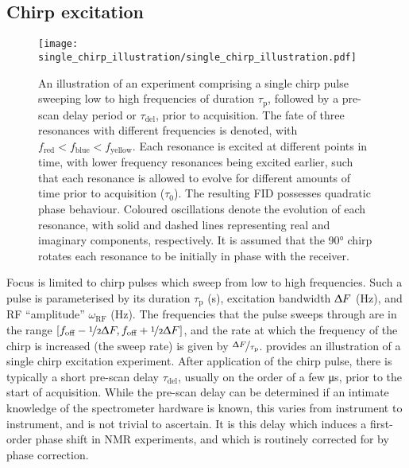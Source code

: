 \subsection{Chirp excitation}
\begin{figure}
    \centering
    \texttt{[image: single\_chirp\_illustration/single\_chirp\_illustration.pdf]}
    \caption[
        An illustration of an experiment comprising a single chirp pulse.
    ]
    {
        An illustration of an experiment comprising a single chirp pulse sweeping
        low to high frequencies of duration $\tau_{\text{p}}$, followed by
        a pre-scan delay period or $\tau_{\text{del}}$, prior to
        acquisition. The fate of three resonances with different frequencies is
        denoted, with $f_{\text{red}} < f_{\text{blue}} <
        f_{\text{yellow}}$. Each resonance is excited at different points
        in time, with lower frequency resonances being excited earlier, such that
        each resonance is allowed to evolve for different amounts of time prior
        to acquisition ($\tau_0$).
        The resulting \ac{FID} possesses quadratic phase behaviour.
        Coloured oscillations denote the evolution of each resonance, with
        solid and dashed lines representing real and imaginary components,
        respectively. It is assumed that the \ang{90} chirp rotates each
        resonance to be initially in phase with the receiver.
    }
    \label{fig:single-chirp}
\end{figure}
Focus is limited to chirp pulses which sweep from low to high
frequencies. Such a pulse is parameterised by
its duration $\tau_{\text{p}}$ (\unit{\second}),
excitation bandwidth $\Updelta F$ (\unit{\hertz}),
and \ac{RF} ``amplitude'' $\omega_{\text{RF}}$ (\unit{\hertz}).
The frequencies that the pulse sweeps through are in the range
$[f_{\text{off}} - \nicefrac{1}{2} \Updelta F,
f_{\text{off}} + \nicefrac{1}{2} \Updelta F]$,
and the rate at which the frequency of the chirp is increased (the sweep
rate) is given by $\nicefrac{\Updelta F}{\tau_{\text{p}}}$.
 provides an illustration of a single chirp
excitation experiment. After application of the chirp pulse, there is typically
a short pre-scan delay $\tau_{\text{del}}$, usually on the order of a few
\unit{\micro\second}, prior to the start of acquisition. While the pre-scan
delay can be determined if an intimate knowledge of the spectrometer hardware
is known, this varies from instrument to instrument, and is not trivial to
ascertain. It is this delay which induces a first-order phase shift in \ac{NMR}
experiments, and which is routinely corrected for by phase correction.
